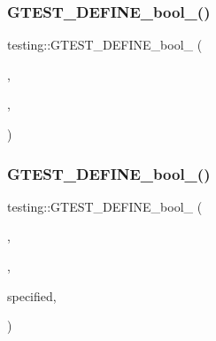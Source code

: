 \mbox{\label{namespacetesting_af95276e3deb9d243d729f3043eabd272}} 
\subsubsection{\texorpdfstring{G\+T\+E\+S\+T\+\_\+\+D\+E\+F\+I\+N\+E\+\_\+bool\+\_\+()}{GTEST\_DEFINE\_bool\_()}\hspace{0.1cm}{\footnotesize\ttfamily [8/9]}}
{\footnotesize\ttfamily testing\+::\+G\+T\+E\+S\+T\+\_\+\+D\+E\+F\+I\+N\+E\+\_\+bool\+\_\+ (\begin{DoxyParamCaption}\item[{shuffle}]{,  }\item[{\hyperlink{namespacetesting_1_1internal_a67132cdce23fb71b6c38ee34ef81eb4c}{internal\+::\+Bool\+From\+G\+Test\+Env}(\char`\"{}shuffle\char`\"{}, false)}]{,  }\item[{\char`\"{}True iff \char`\"{} G\+T\+E\+S\+T\+\_\+\+N\+A\+M\+E\+\_\+ \char`\"{} should randomize tests\textquotesingle{} order on every run.\char`\"{}}]{ }\end{DoxyParamCaption})}

\mbox{\label{namespacetesting_a7598962574c3fff25237b78f0de81aa7}} 
\subsubsection{\texorpdfstring{G\+T\+E\+S\+T\+\_\+\+D\+E\+F\+I\+N\+E\+\_\+bool\+\_\+()}{GTEST\_DEFINE\_bool\_()}\hspace{0.1cm}{\footnotesize\ttfamily [9/9]}}
{\footnotesize\ttfamily testing\+::\+G\+T\+E\+S\+T\+\_\+\+D\+E\+F\+I\+N\+E\+\_\+bool\+\_\+ (\begin{DoxyParamCaption}\item[{throw\+\_\+on\+\_\+failure}]{,  }\item[{\hyperlink{namespacetesting_1_1internal_a67132cdce23fb71b6c38ee34ef81eb4c}{internal\+::\+Bool\+From\+G\+Test\+Env}(\char`\"{}throw\+\_\+on\+\_\+failure\char`\"{}, false)}]{,  }\item[{\char`\"{}When this flag is}]{specified,  }\item[{a failed assertion will throw an exception \char`\"{} \char`\"{}if exceptions are enabled or exit the program with a non-\/zero code \char`\"{} \char`\"{}otherwise.\char`\"{}}]{ }\end{DoxyParamCaption})}

